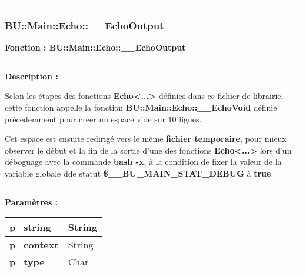 \documentclass[a4paper,10pt]{article}
\begin{document}


\color{sec3}\par\noindent\rule{\textwidth}{0.4pt}\color{text}\setlength{\parskip}{1em}

\color{sec3}
\subsubsection{BU::Main::Echo::\_\_EchoOutput}\color{text}

\begin{justify}
    \textbf{Fonction : \color{func}BU::Main::Echo::\_\_EchoOutput}
\end{justify}


\par\noindent\rule{\textwidth}{0.4pt}

\begin{justify}
    \textbf{Description :}

    Selon les étapes des fonctions \textbf{\color{func}Echo<...>} définies dans ce fichier de librairie, cette fonction appelle la fonction \textbf{\color{func}BU::Main::Echo::\_\_EchoVoid} définie précédemment pour créer un espace vide sur 10 lignes.

    Cet espace est ensuite redirigé vers le même \textbf{\color{path}fichier temporaire}, pour mieux observer le début et la fin de la sortie d'une des fonctions \textbf{\color{func}Echo<...>} lors d'un déboguage avec la commande \textbf{\color{cmds}bash -x}, à la condition de fixer la valeur de la variable globale dde statut \textbf{\color{vars}\$\_\_BU\_MAIN\_STAT\_DEBUG} à \textbf{true}.
\end{justify}


\par\noindent\rule{\textwidth}{0.4pt}

\begin{justify}
    \textbf{Paramètres :}

    \begin{tabular}{|l|l|}
        \hline
        \textbf{\color{vars}p\_string} & String\\
        \hline
        \textbf{\color{vars}p\_context} & String\\
        \hline
        \textbf{\color{vars}p\_type} & Char\\
        \hline
    \end{tabular}
\end{justify}
\end{document}
